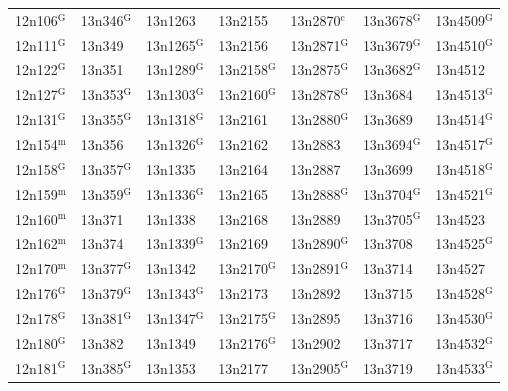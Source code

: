\documentclass[12pt, oneside]{amsart}
\begin{document}
{\begin{longtable}{*{7}{>{\raggedright\arraybackslash}p{}}}
12n106$^{\mathrm{G}}$ & 13n346$^{\mathrm{G}}$ & 13n1263 & 13n2155 & 13n2870$^{\mathrm{c}}$ & 13n3678$^{\mathrm{G}}$ & 13n4509$^{\mathrm{G}}$ \\
12n111$^{\mathrm{G}}$ & 13n349 & 13n1265$^{\mathrm{G}}$ & 13n2156 & 13n2871$^{\mathrm{G}}$ & 13n3679$^{\mathrm{G}}$ & 13n4510$^{\mathrm{G}}$ \\
12n122$^{\mathrm{G}}$ & 13n351 & 13n1289$^{\mathrm{G}}$ & 13n2158$^{\mathrm{G}}$ & 13n2875$^{\mathrm{G}}$ & 13n3682$^{\mathrm{G}}$ & 13n4512 \\
12n127$^{\mathrm{G}}$ & 13n353$^{\mathrm{G}}$ & 13n1303$^{\mathrm{G}}$ & 13n2160$^{\mathrm{G}}$ & 13n2878$^{\mathrm{G}}$ & 13n3684 & 13n4513$^{\mathrm{G}}$ \\
12n131$^{\mathrm{G}}$ & 13n355$^{\mathrm{G}}$ & 13n1318$^{\mathrm{G}}$ & 13n2161 & 13n2880$^{\mathrm{G}}$ & 13n3689 & 13n4514$^{\mathrm{G}}$ \\
12n154$^{\mathrm{m}}$ & 13n356 & 13n1326$^{\mathrm{G}}$ & 13n2162 & 13n2883 & 13n3694$^{\mathrm{G}}$ & 13n4517$^{\mathrm{G}}$ \\
12n158$^{\mathrm{G}}$ & 13n357$^{\mathrm{G}}$ & 13n1335 & 13n2164 & 13n2887 & 13n3699 & 13n4518$^{\mathrm{G}}$ \\
12n159$^{\mathrm{m}}$ & 13n359$^{\mathrm{G}}$ & 13n1336$^{\mathrm{G}}$ & 13n2165 & 13n2888$^{\mathrm{G}}$ & 13n3704$^{\mathrm{G}}$ & 13n4521$^{\mathrm{G}}$ \\
12n160$^{\mathrm{m}}$ & 13n371 & 13n1338 & 13n2168 & 13n2889 & 13n3705$^{\mathrm{G}}$ & 13n4523 \\
12n162$^{\mathrm{m}}$ & 13n374 & 13n1339$^{\mathrm{G}}$ & 13n2169 & 13n2890$^{\mathrm{G}}$ & 13n3708 & 13n4525$^{\mathrm{G}}$ \\
12n170$^{\mathrm{m}}$ & 13n377$^{\mathrm{G}}$ & 13n1342 & 13n2170$^{\mathrm{G}}$ & 13n2891$^{\mathrm{G}}$ & 13n3714 & 13n4527 \\
12n176$^{\mathrm{G}}$ & 13n379$^{\mathrm{G}}$ & 13n1343$^{\mathrm{G}}$ & 13n2173 & 13n2892 & 13n3715 & 13n4528$^{\mathrm{G}}$ \\
12n178$^{\mathrm{G}}$ & 13n381$^{\mathrm{G}}$ & 13n1347$^{\mathrm{G}}$ & 13n2175$^{\mathrm{G}}$ & 13n2895 & 13n3716 & 13n4530$^{\mathrm{G}}$ \\
12n180$^{\mathrm{G}}$ & 13n382 & 13n1349 & 13n2176$^{\mathrm{G}}$ & 13n2902 & 13n3717 & 13n4532$^{\mathrm{G}}$ \\
12n181$^{\mathrm{G}}$ & 13n385$^{\mathrm{G}}$ & 13n1353 & 13n2177 & 13n2905$^{\mathrm{G}}$ & 13n3719 & 13n4533$^{\mathrm{G}}$ \\

\end{longtable}}
\end{document}
